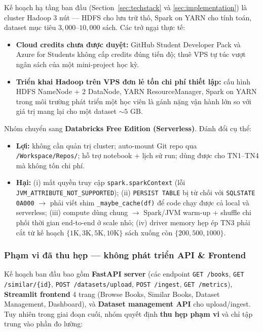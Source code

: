 Kế hoạch hạ tầng ban đầu (Section~\ref{sec:techstack} và \ref{sec:implementation}) là cluster Hadoop $3$ nút --- HDFS cho lưu trữ thô, Spark on YARN cho tính toán, dataset mục tiêu $3{,}000$--$10{,}000$ sách. Các trở ngại thực tế:

\begin{itemize}
    \item \textbf{Cloud credits chưa được duyệt:} GitHub Student Developer Pack và Azure for Students không cấp credits đúng tiến độ; thuê VPS tự túc vượt ngân sách của một mini-project học kỳ.
    \item \textbf{Triển khai Hadoop trên VPS đơn lẻ tốn chi phí thiết lập:} cấu hình HDFS NameNode + 2 DataNode, YARN ResourceManager, Spark on YARN trong môi trường phát triển một học viên là gánh nặng vận hành lớn so với giá trị mang lại cho một dataset $\sim 5$ GB.
\end{itemize}

Nhóm chuyển sang \textbf{Databricks Free Edition (Serverless)}. Đánh đổi cụ thể:

\begin{itemize}
    \item \textbf{Lợi:} không cần quản trị cluster; auto-mount Git repo qua \texttt{/Workspace/Repos/}; hỗ trợ notebook + lịch sử run; dùng được cho TN1--TN4 mà không tốn chi phí.
    \item \textbf{Hại:} (i) mất quyền truy cập \texttt{spark.sparkContext} (lỗi \texttt{JVM\_AT\-TRI\-BUTE\_NOT\_SUPPORTED}); (ii) \texttt{PERSIST TABLE} bị từ chối với \texttt{SQLSTATE 0A000} $\rightarrow$ phải viết shim \texttt{\_maybe\_cache(df)} để code chạy được cả local và serverless; (iii) compute dùng chung $\rightarrow$ Spark/JVM warm-up + shuffle chi phối thời gian end-to-end ở scale nhỏ; (iv) driver memory hẹp ép TN3 phải cắt từ kế hoạch $\{1\text{K}, 3\text{K}, 5\text{K}, 10\text{K}\}$ sách xuống còn $\{200, 500, 1000\}$.
\end{itemize}

\subsubsection{Phạm vi đã thu hẹp --- không phát triển API \& Frontend}

Kế hoạch ban đầu bao gồm \textbf{FastAPI server} (các endpoint \texttt{GET /books}, \texttt{GET /similar/\{id\}}, \texttt{POST /datasets/upload}, \texttt{POST /ingest}, \texttt{GET /metrics}), \textbf{Streamlit frontend} 4 trang (Browse Books, Similar Books, Dataset Management, Dashboard), và \textbf{Dataset management API} cho upload/ingest. Tuy nhiên trong giai đoạn cuối, nhóm quyết định \textbf{thu hẹp phạm vi} và chỉ tập trung vào phần đo lường:

